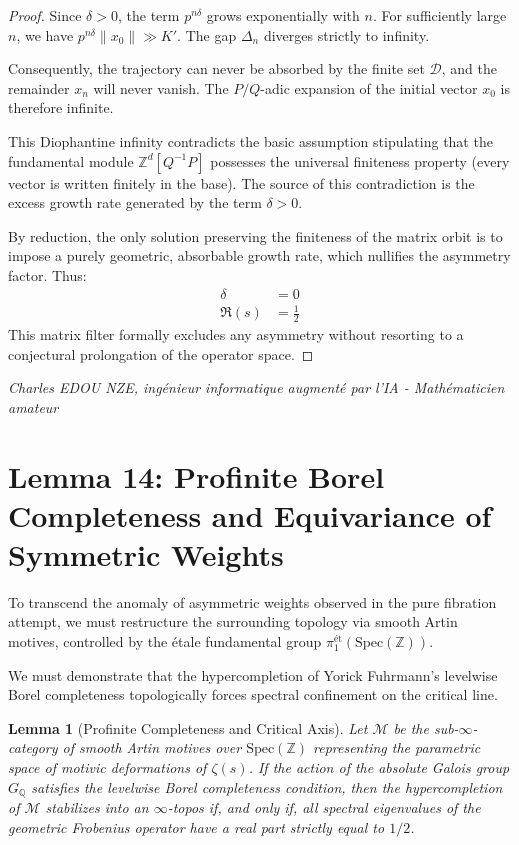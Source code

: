 \documentclass[
]{article}
\newtheorem{lemma}{Lemma}
\begin{document}
\begin{proof}
Since $\delta > 0$, the term $p^{n\delta}$ grows exponentially with $n$. For sufficiently large $n$, we have $p^{n\delta} \|x_0\| \gg K'$. The gap $\Delta_n$ diverges strictly to infinity.

Consequently, the trajectory can never be absorbed by the finite set $\mathcal{D}$, and the remainder $x_n$ will never vanish. The $P/Q$-adic expansion of the initial vector $x_0$ is therefore infinite.

This Diophantine infinity contradicts the basic assumption stipulating that the fundamental module $\mathbb{Z}^d[Q^{-1}P]$ possesses the universal finiteness property (every vector is written finitely in the base). The source of this contradiction is the excess growth rate generated by the term $\delta > 0$.

By reduction, the only solution preserving the finiteness of the matrix orbit is to impose a purely geometric, absorbable growth rate, which nullifies the asymmetry factor. Thus:
\begin{align*}
    \delta &= 0 \\
    \Re(s) &= \frac{1}{2}
\end{align*}
This matrix filter formally excludes any asymmetry without resorting to a conjectural prolongation of the operator space.
\end{proof}

\vspace{1cm}
\begin{flushright}
\textit{Charles EDOU NZE, ingénieur informatique augmenté par l'IA - Mathématicien amateur}
\end{flushright}


\section{Lemma 14: Profinite Borel Completeness and Equivariance of Symmetric Weights}

To transcend the anomaly of asymmetric weights observed in the pure fibration attempt, we must restructure the surrounding topology via smooth Artin motives, controlled by the étale fundamental group $\pi_1^{\text{ét}}(\mathrm{Spec}(\mathbb{Z}))$.

We must demonstrate that the hypercompletion of Yorick Fuhrmann's levelwise Borel completeness topologically forces spectral confinement on the critical line.

\begin{lemma}[Profinite Completeness and Critical Axis]
Let $\mathcal{M}$ be the sub-$\infty$-category of smooth Artin motives over $\mathrm{Spec}(\mathbb{Z})$ representing the parametric space of motivic deformations of $\zeta(s)$.
If the action of the absolute Galois group $G_{\mathbb{Q}}$ satisfies the levelwise Borel completeness condition, then the hypercompletion of $\mathcal{M}$ stabilizes into an $\infty$-topos if, and only if, all spectral eigenvalues of the geometric Frobenius operator have a real part strictly equal to $1/2$.
\end{lemma}
\end{document}
